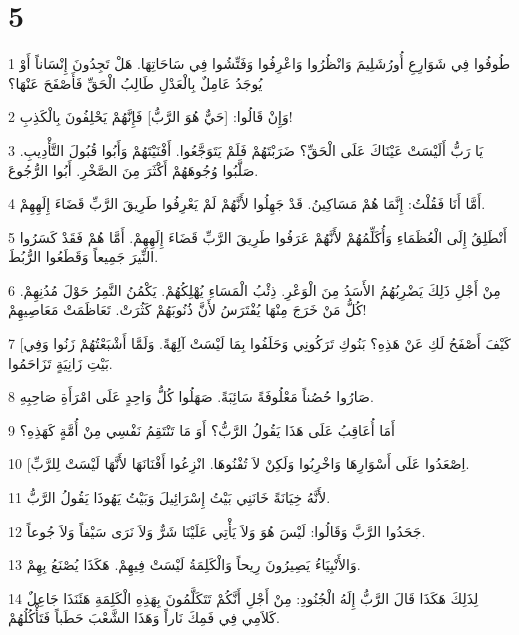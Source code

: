 \chapter{5}

\par 1 طُوفُوا فِي شَوَارِعِ أُورُشَلِيمَ وَانْظُرُوا وَاعْرِفُوا وَفَتِّشُوا فِي سَاحَاتِهَا. هَلْ تَجِدُونَ إِنْسَاناً أَوْ يُوجَدُ عَامِلٌ بِالْعَدْلِ طَالِبُ الْحَقِّ فَأَصْفَحَ عَنْهَا؟
\par 2 وَإِنْ قَالُوا: [حَيٌّ هُوَ الرَّبُّ] فَإِنَّهُمْ يَحْلِفُونَ بِالْكَذِبِ!
\par 3 يَا رَبُّ أَلَيْسَتْ عَيْنَاكَ عَلَى الْحَقِّ؟ ضَرَبْتَهُمْ فَلَمْ يَتَوَجَّعُوا. أَفْنَيْتَهُمْ وَأَبُوا قُبُولَ التَّأْدِيبِ. صَلَّبُوا وُجُوهَهُمْ أَكْثَرَ مِنَ الصَّخْرِ. أَبُوا الرُّجُوعَ.
\par 4 أَمَّا أَنَا فَقُلْتُ: إِنَّمَا هُمْ مَسَاكِينُ. قَدْ جَهِلُوا لأَنَّهُمْ لَمْ يَعْرِفُوا طَرِيقَ الرَّبِّ قَضَاءَ إِلَهِهِمْ.
\par 5 أَنْطَلِقُ إِلَى الْعُظَمَاءِ وَأُكَلِّمُهُمْ لأَنَّهُمْ عَرَفُوا طَرِيقَ الرَّبِّ قَضَاءَ إِلَهِهِمْ. أَمَّا هُمْ فَقَدْ كَسَرُوا النِّيرَ جَمِيعاً وَقَطَعُوا الرُّبُطَ.
\par 6 مِنْ أَجْلِ ذَلِكَ يَضْرِبُهُمُ الأَسَدُ مِنَ الْوَعْرِ. ذِئْبُ الْمَسَاءِ يُهْلِكُهُمْ. يَكْمُنُ النَّمِرُ حَوْلَ مُدُنِهِمْ. كُلُّ مَنْ خَرَجَ مِنْهَا يُفْتَرَسُ لأَنَّ ذُنُوبَهُمْ كَثُرَتْ. تَعَاظَمَتْ مَعَاصِيهِمْ!
\par 7 [كَيْفَ أَصْفَحُ لَكِ عَنْ هَذِهِ؟ بَنُوكِ تَرَكُونِي وَحَلَفُوا بِمَا لَيْسَتْ آلِهَةً. وَلَمَّا أَشْبَعْتُهُمْ زَنُوا وَفِي بَيْتِ زَانِيَةٍ تَزَاحَمُوا.
\par 8 صَارُوا حُصُناً مَعْلُوفَةً سَائِبَةً. صَهَلُوا كُلُّ وَاحِدٍ عَلَى امْرَأَةِ صَاحِبِهِ.
\par 9 أَمَا أُعَاقِبُ عَلَى هَذَا يَقُولُ الرَّبُّ؟ أَوَ مَا تَنْتَقِمُ نَفْسِي مِنْ أُمَّةٍ كَهَذِهِ؟
\par 10 [اِصْعَدُوا عَلَى أَسْوَارِهَا وَاخْرِبُوا وَلَكِنْ لاَ تُفْنُوهَا. انْزِعُوا أَفْنَانَهَا لأَنَّهَا لَيْسَتْ لِلرَّبِّ.
\par 11 لأَنَّهُ خِيَانَةً خَانَنِي بَيْتُ إِسْرَائِيلَ وَبَيْتُ يَهُوذَا يَقُولُ الرَّبُّ.
\par 12 جَحَدُوا الرَّبَّ وَقَالُوا: لَيْسَ هُوَ وَلاَ يَأْتِي عَلَيْنَا شَرٌّ وَلاَ نَرَى سَيْفاً وَلاَ جُوعاً.
\par 13 وَالأَنْبِيَاءُ يَصِيرُونَ رِيحاً وَالْكَلِمَةُ لَيْسَتْ فِيهِمْ. هَكَذَا يُصْنَعُ بِهِمْ.
\par 14 لِذَلِكَ هَكَذَا قَالَ الرَّبُّ إِلَهُ الْجُنُودِ: مِنْ أَجْلِ أَنَّكُمْ تَتَكَلَّمُونَ بِهَذِهِ الْكَلِمَةِ هَئَنَذَا جَاعِلٌ كَلاَمِي فِي فَمِكَ نَاراً وَهَذَا الشَّعْبَ حَطَباً فَتَأْكُلُهُمْ.
